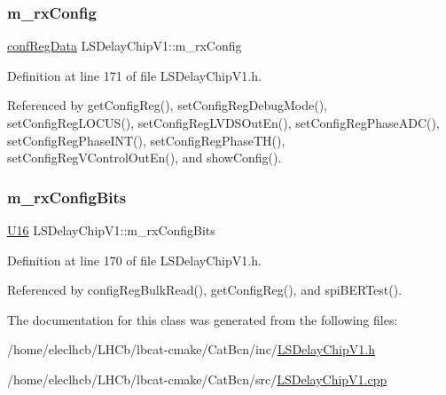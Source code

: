 \mbox{\label{classLSDelayChipV1_a4818ac5c0d7ccf2845a01226234bdb67}} 
\subsubsection{\texorpdfstring{m\+\_\+rx\+Config}{m\_rxConfig}}
{\footnotesize\ttfamily \hyperlink{structconfRegData}{conf\+Reg\+Data} L\+S\+Delay\+Chip\+V1\+::m\+\_\+rx\+Config\hspace{0.3cm}{\ttfamily [private]}}



Definition at line 171 of file L\+S\+Delay\+Chip\+V1.\+h.



Referenced by get\+Config\+Reg(), set\+Config\+Reg\+Debug\+Mode(), set\+Config\+Reg\+L\+O\+C\+U\+S(), set\+Config\+Reg\+L\+V\+D\+S\+Out\+En(), set\+Config\+Reg\+Phase\+A\+D\+C(), set\+Config\+Reg\+Phase\+I\+N\+T(), set\+Config\+Reg\+Phase\+T\+H(), set\+Config\+Reg\+V\+Control\+Out\+En(), and show\+Config().

\mbox{\label{classLSDelayChipV1_ae049797212539b231b9722ae69a0491d}} 
\subsubsection{\texorpdfstring{m\+\_\+rx\+Config\+Bits}{m\_rxConfigBits}}
{\footnotesize\ttfamily \hyperlink{ICECALv3_8h_adf928e51a60dba0df29d615401cc55a8}{U16} L\+S\+Delay\+Chip\+V1\+::m\+\_\+rx\+Config\+Bits\hspace{0.3cm}{\ttfamily [private]}}



Definition at line 170 of file L\+S\+Delay\+Chip\+V1.\+h.



Referenced by config\+Reg\+Bulk\+Read(), get\+Config\+Reg(), and spi\+B\+E\+R\+Test().



The documentation for this class was generated from the following files\+:\begin{DoxyCompactItemize}
\item 
/home/eleclhcb/\+L\+H\+Cb/lbcat-\/cmake/\+Cat\+Bcn/inc/\hyperlink{LSDelayChipV1_8h}{L\+S\+Delay\+Chip\+V1.\+h}\item 
/home/eleclhcb/\+L\+H\+Cb/lbcat-\/cmake/\+Cat\+Bcn/src/\hyperlink{LSDelayChipV1_8cpp}{L\+S\+Delay\+Chip\+V1.\+cpp}\end{DoxyCompactItemize}
